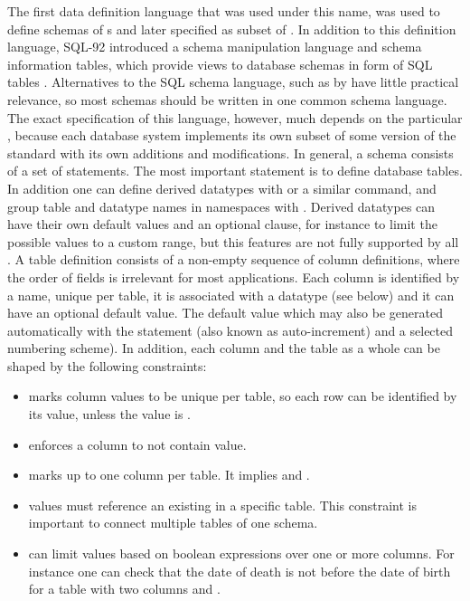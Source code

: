 The first data definition language that was used under this name, was used to
define schemas of s and later specified as subset of
.  In addition to this  definition language, SQL-92
introduced a schema manipulation language and schema information tables, which
provide views to database schemas in form of SQL tables \cite{Date1997}.
Alternatives to the SQL schema language, such as  by
\textcite{Date2006} have little practical relevance, so most  schemas
should be written in one common schema language. The exact specification of
this language, however, much depends on the particular , because
each database system implements its own subset of some version of the
 standard with its own additions and modifications. In general, a
schema consists of a set of  statements.  The most important
statement is  to define database tables.  In addition one can
define derived datatypes with  or a similar command, and
group table and datatype names in namespaces with . Derived
datatypes can have their own default values and an optional  clause,
for instance to limit the possible values to a custom range, but this features
are not fully supported by all .  A table definition consists of a
non-empty sequence of column definitions, where the order of fields is
irrelevant for most applications. Each column is identified by a name, unique
per table, it is associated with a datatype (see below) and it can have an
optional default value. The default value which may also be generated
automatically with the  statement (also known as auto-increment)
and a selected numbering scheme).  In addition, each column and the table as a
whole can be shaped by the following constraints:

\begin{itemize}
 \item {} marks column values to be unique per table, so each 
   row can be identified by its value, unless the value is .
 \item {} enforces a column to not contain  value.
 \item {} marks up to one column per table. 
   It implies  and .
 \item {} values must reference an existing  in a 
   specific table. This constraint is important to connect multiple tables of one schema.
 \item {} can limit values based on boolean expressions over one or more
   columns. For instance one can check that the date of death is not before the date of birth
   for a table with two columns  and .
\end{itemize}

